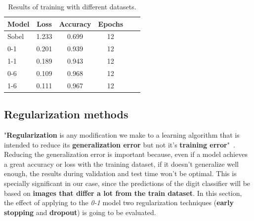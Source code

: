 \begin{table}
	\centering
	\begin{tabular}{l*{4}{c}r}
		\textbf{Model} & \textbf{Loss} & \textbf{Accuracy} & \textbf{Epochs} \\
		\hline
		Sobel & 1.233 & 0.699 & 12 \\
		0-1 & 0.201 & 0.939 & 12 \\
		1-1 & 0.189 & 0.943 & 12 \\
		0-6 & 0.109 & 0.968 & 12 \\
		1-6 & 0.111 & 0.967 & 12 \\
	\end{tabular}
	\caption{Results of training with different datasets.}
	\label{tbl:datasets}
\end{table}

\subsection{Regularization methods}
"\textbf{Regularization} is any modification we make to a learning algorithm that is intended to reduce its \textbf{generalization error} but not it's \textbf{training error}"~\cite{Goodfellow-et-al-2016}. Reducing the generalization error is important because, even if a model achieves a great accuracy or loss with the training dataset, if it doesn't generalize well enough, the results during validation and test time won't be optimal. This is specially significant in our case, since the predictions of the digit classifier will be based on \textbf{images that differ a lot from the train dataset}. In this section, the effect of applying to the \textit{0-1} model two regularization techniques (\textbf{early stopping} and \textbf{dropout}) is going to be evaluated. 

